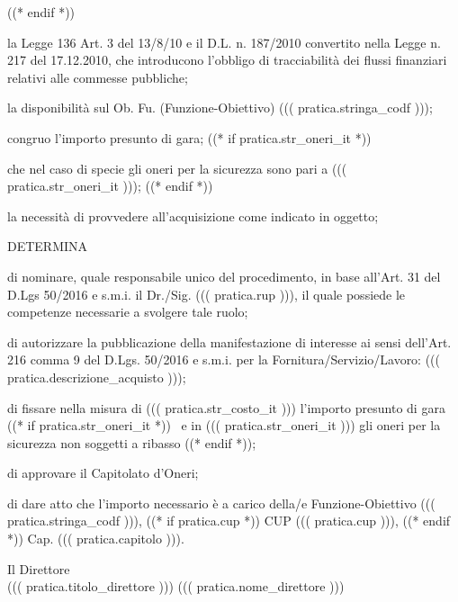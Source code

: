 \documentclass[a4paper,12pt]{letter}
\begin{document}
\begin{list}{VALUTATA}{}
   ((* endif *))
\item[VISTA] la Legge 136 Art. 3 del 13/8/10 e il D.L. n. 187/2010 convertito
	nella Legge n. 217 del 17.12.2010, che introducono l'obbligo di
	tracciabilit\`a dei flussi finanziari relativi alle commesse pubbliche; 
\item[VISTA] la disponibilit\`a sul Ob. Fu. (Funzione-Obiettivo) ((( pratica.stringa_codf ))); 
\item[VALUTATO] congruo l'importo presunto di gara;
((* if pratica.str_oneri_it *))
\item[RILEVATO] che nel caso di specie gli oneri per la sicurezza sono pari
	a ((( pratica.str_oneri_it )));
((* endif *))
\item[VALUTATA] la necessit\`a di provvedere all'acquisizione come indicato in oggetto;
\end{list}

\begin{center}
DETERMINA
\end{center}

\begin{list}{VALUTATA}{}
\item[Art.~1:] di nominare, quale responsabile unico del procedimento, in base 
           all'Art. 31 del D.Lgs 50/2016 e s.m.i. il Dr./Sig. ((( pratica.rup ))),
           il quale possiede le competenze necessarie a svolgere tale ruolo; 
\item[Art.~2:] di autorizzare la pubblicazione della manifestazione di interesse
	ai sensi dell’Art. 216 comma 9 del D.Lgs. 50/2016 e s.m.i.
        per la Fornitura/Servizio/Lavoro: ((( pratica.descrizione_acquisto )));

\item[Art.~3:] di fissare nella misura di ((( pratica.str_costo_it ))) l'importo presunto di gara%
((* if pratica.str_oneri_it *))%
 ~e in ((( pratica.str_oneri_it ))) gli oneri per la sicurezza non soggetti a ribasso%
((* endif *));

\item[Art.~4:] di approvare il Capitolato d'Oneri;

\item[Art.~5:] di dare atto che l'importo necessario \`e a carico della/e Funzione-Obiettivo ((( pratica.stringa_codf ))), ((* if pratica.cup *)) CUP ((( pratica.cup ))), ((* endif *)) Cap. ((( pratica.capitolo ))).
\end{list}

\vspace{0.5cm}

\begin{flushright}
\begin{minipage}[t]{6cm}
\begin{center}
Il Direttore \\
((( pratica.titolo_direttore ))) ((( pratica.nome_direttore )))
\end{center}
\end{minipage}
\end{flushright}
\end{document}
